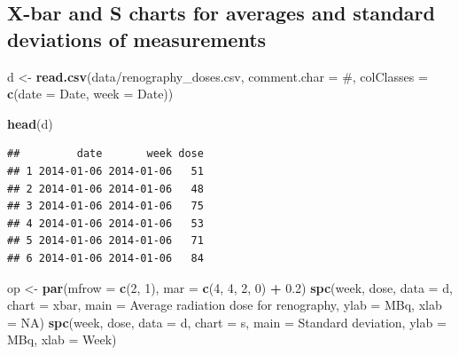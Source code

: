 \documentclass[
]{book}
\newenvironment{Shaded}{\begin{snugshade}}{\end{snugshade}}
\newcommand{\AttributeTok}[1]{\textcolor[rgb]{0.13,0.29,0.53}{#1}}
\newcommand{\ConstantTok}[1]{\textcolor[rgb]{0.56,0.35,0.01}{#1}}
\newcommand{\DecValTok}[1]{\textcolor[rgb]{0.00,0.00,0.81}{#1}}
\newcommand{\FloatTok}[1]{\textcolor[rgb]{0.00,0.00,0.81}{#1}}
\newcommand{\FunctionTok}[1]{\textcolor[rgb]{0.13,0.29,0.53}{\textbf{#1}}}
\newcommand{\NormalTok}[1]{#1}
\newcommand{\OtherTok}[1]{\textcolor[rgb]{0.56,0.35,0.01}{#1}}
\newcommand{\SpecialCharTok}[1]{\textcolor[rgb]{0.81,0.36,0.00}{\textbf{#1}}}
\newcommand{\StringTok}[1]{\textcolor[rgb]{0.31,0.60,0.02}{#1}}
\begin{document}
\subsection{X-bar and S charts for averages and standard deviations of
measurements}\label{x-bar-and-s-charts-for-averages-and-standard-deviations-of-measurements}

\begin{Shaded}
\begin{Highlighting}[]
\NormalTok{d }\OtherTok{\textless{}{-}} \FunctionTok{read.csv}\NormalTok{(}\StringTok{\textquotesingle{}data/renography\_doses.csv\textquotesingle{}}\NormalTok{,}
              \AttributeTok{comment.char =} \StringTok{\textquotesingle{}\#\textquotesingle{}}\NormalTok{,}
              \AttributeTok{colClasses   =} \FunctionTok{c}\NormalTok{(}\AttributeTok{date =} \StringTok{\textquotesingle{}Date\textquotesingle{}}\NormalTok{,}
                               \AttributeTok{week =} \StringTok{\textquotesingle{}Date\textquotesingle{}}\NormalTok{))}

\FunctionTok{head}\NormalTok{(d)}
\end{Highlighting}
\end{Shaded}

\begin{verbatim}
##         date       week dose
## 1 2014-01-06 2014-01-06   51
## 2 2014-01-06 2014-01-06   48
## 3 2014-01-06 2014-01-06   75
## 4 2014-01-06 2014-01-06   53
## 5 2014-01-06 2014-01-06   71
## 6 2014-01-06 2014-01-06   84
\end{verbatim}

\begin{Shaded}
\begin{Highlighting}[]
\NormalTok{op }\OtherTok{\textless{}{-}} \FunctionTok{par}\NormalTok{(}\AttributeTok{mfrow =} \FunctionTok{c}\NormalTok{(}\DecValTok{2}\NormalTok{, }\DecValTok{1}\NormalTok{),}
          \AttributeTok{mar   =} \FunctionTok{c}\NormalTok{(}\DecValTok{4}\NormalTok{, }\DecValTok{4}\NormalTok{, }\DecValTok{2}\NormalTok{, }\DecValTok{0}\NormalTok{) }\SpecialCharTok{+} \FloatTok{0.2}\NormalTok{)}
\FunctionTok{spc}\NormalTok{(week, dose,}
    \AttributeTok{data  =}\NormalTok{ d,}
    \AttributeTok{chart =} \StringTok{\textquotesingle{}xbar\textquotesingle{}}\NormalTok{,}
    \AttributeTok{main  =} \StringTok{\textquotesingle{}Average radiation dose for renography\textquotesingle{}}\NormalTok{,}
    \AttributeTok{ylab  =} \StringTok{\textquotesingle{}MBq\textquotesingle{}}\NormalTok{,}
    \AttributeTok{xlab  =} \ConstantTok{NA}\NormalTok{)}
\FunctionTok{spc}\NormalTok{(week, dose,}
    \AttributeTok{data  =}\NormalTok{ d,}
    \AttributeTok{chart =} \StringTok{\textquotesingle{}s\textquotesingle{}}\NormalTok{,}
    \AttributeTok{main  =} \StringTok{\textquotesingle{}Standard deviation\textquotesingle{}}\NormalTok{,}
    \AttributeTok{ylab  =} \StringTok{\textquotesingle{}MBq\textquotesingle{}}\NormalTok{,}
    \AttributeTok{xlab  =} \StringTok{\textquotesingle{}Week\textquotesingle{}}\NormalTok{)}
\end{Highlighting}
\end{Shaded}
\end{document}
